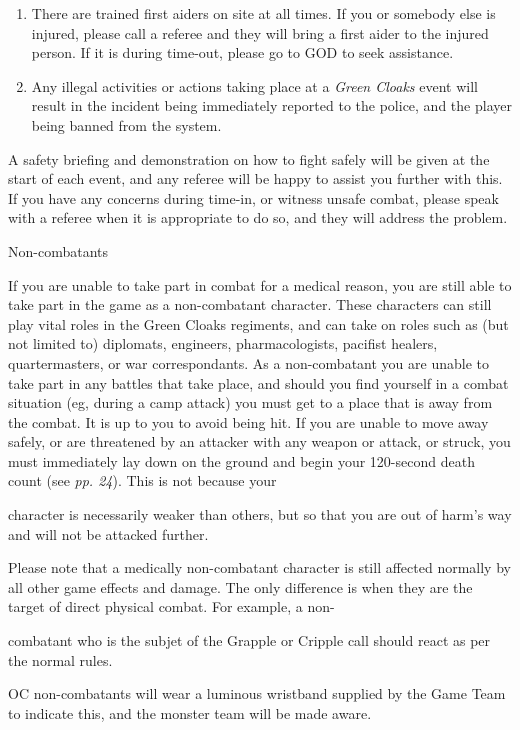 \begin{enumerate}[1]
\item There are trained first aiders on site at all times. If you or somebody else is injured, please call a referee and they will bring a first aider to the injured person. If it is during time-out, please go to GOD to seek assistance.

\item Any illegal activities or actions taking place at a \textit{Green Cloaks} event will result in the incident being immediately reported to the police, and the player being banned from the system.

\end{enumerate}

A safety briefing and demonstration on how to fight safely will be given at the start of each event, and any referee will be happy to assist you further with this. If you have any concerns during time-in, or witness unsafe combat, please speak with a referee when it is appropriate to do so, and they will address the problem.

Non-combatants

If you are unable to take part in combat for a medical reason, you are still able to take part in the game as a non-combatant character. These characters can still play vital roles in the Green Cloaks regiments, and can take on roles such as (but not limited to) diplomats, engineers, pharmacologists, pacifist healers, quartermasters, or war correspondants. As a non-combatant you are unable to take part in any battles that take place, and should you find yourself in a combat situation (eg, during a camp attack) you must get to a place that is away from the combat. It is up to you to avoid being hit. If you are unable to move away safely, or are threatened by an attacker with any weapon or attack, or struck, you must immediately lay down on the ground and begin your 120-second death count (see \textit{pp. 24}). This is not because your

character is necessarily weaker than others, but so that you are out of harm's way and will not be attacked further.

Please note that a medically non-combatant character is still affected normally by all other game effects and damage. The only difference is when they are the target of direct physical combat. For example, a non-

combatant who is the subjet of the Grapple or Cripple call should react as per the normal rules.

OC non-combatants will wear a luminous wristband supplied by the Game Team to indicate this, and the monster team will be made aware.

